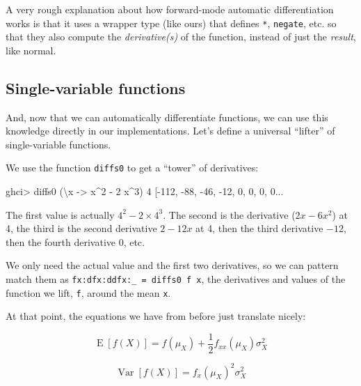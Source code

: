 \documentclass[]{article}
\newenvironment{Shaded}{}{}
\newcommand{\DecValTok}[1]{\textcolor[rgb]{0.25,0.63,0.44}{{#1}}}
\newcommand{\OtherTok}[1]{\textcolor[rgb]{0.00,0.44,0.13}{{#1}}}
\newcommand{\FunctionTok}[1]{\textcolor[rgb]{0.02,0.16,0.49}{{#1}}}
\newcommand{\NormalTok}[1]{{#1}}
\begin{document}
A very rough explanation about how forward-mode automatic
differentiation works is that it uses a wrapper type (like ours) that
defines \texttt{*}, \texttt{negate}, etc. so that they also compute the
\emph{derivative(s)} of the function, instead of just the \emph{result},
like normal.

\subsection{Single-variable functions}\label{single-variable-functions}

And, now that we can automatically differentiate functions, we can use
this knowledge directly in our implementations. Let's define a universal
``lifter'' of single-variable functions.

We use the function \texttt{diffs0} to get a ``tower'' of derivatives:

\begin{Shaded}
\begin{Highlighting}[]
\NormalTok{ghci}\FunctionTok{>} \NormalTok{diffs0 (\textbackslash{}x }\OtherTok{->} \NormalTok{x}\FunctionTok{^}\DecValTok{2} \FunctionTok{-} \DecValTok{2} \NormalTok{x}\FunctionTok{^}\DecValTok{3}\NormalTok{) }\DecValTok{4}
\NormalTok{[}\FunctionTok{-}\DecValTok{112}\NormalTok{, }\FunctionTok{-}\DecValTok{88}\NormalTok{, }\FunctionTok{-}\DecValTok{46}\NormalTok{, }\FunctionTok{-}\DecValTok{12}\NormalTok{, }\DecValTok{0}\NormalTok{, }\DecValTok{0}\NormalTok{, }\DecValTok{0}\NormalTok{, }\DecValTok{0}\FunctionTok{...}
\end{Highlighting}
\end{Shaded}

The first value is actually \(4^2 - 2 \times 4^3\). The second is the
derivative (\(2 x - 6x^2\)) at 4, the third is the second derivative
\(2 - 12 x\) at 4, then the third derivative \(-12\), then the fourth
derivative \(0\), etc.

We only need the actual value and the first two derivatives, so we can
pattern match them as \texttt{fx:dfx:ddfx:\_\ =\ diffs0\ f\ x}, the
derivatives and values of the function we lift, \texttt{f}, around the
mean \texttt{x}.

At that point, the equations we have from before just translate nicely:

\[
\operatorname{E}[f(X)] = f(\mu_X) + \frac{1}{2} f_{xx}(\mu_X) \sigma_X^2
\]

\[
\operatorname{Var}[f(X)] = f_x(\mu_X)^2 \sigma_X^2
\]
\end{document}
